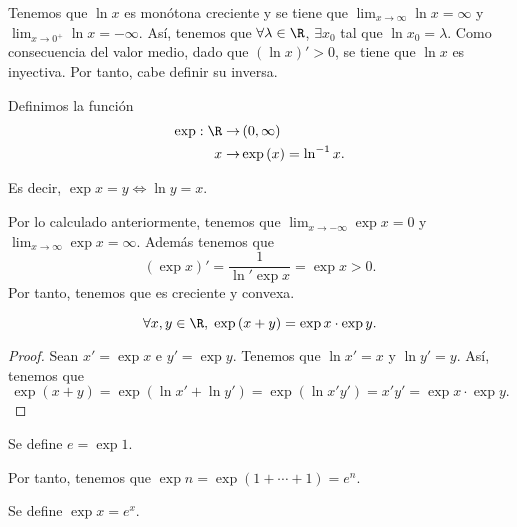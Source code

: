 \begin{observation}
\normalfont Tenemos que $\displaystyle \ln x $ es monótona creciente y se tiene que $\displaystyle \lim_{x \to \infty}\ln x = \infty $ y $\displaystyle \lim_{x \to 0^{+}} \ln x =- \infty$. Así, tenemos que $\displaystyle \forall \lambda \in \R $, $\displaystyle \exists x_{0} $ tal que $\displaystyle \ln x_{0} = \lambda$.
Como consecuencia del valor medio, dado que $\displaystyle \left(\ln x\right)' > 0 $, se tiene que $\displaystyle \ln x  $ es inyectiva. Por tanto, cabe definir su inversa.
\end{observation}
\begin{fdefinition}
\normalfont Definimos la función
\[
\begin{split}
	\exp : \R \to & \left(0, \infty\right) \\
	x \to & \exp\left(x\right) = \ln^{-1}x.
\end{split}
\]
\end{fdefinition}
\begin{observation}
\normalfont Es decir, $\displaystyle \exp x = y \iff \ln y = x $.
\end{observation}
Por lo calculado anteriormente, tenemos que $\displaystyle \lim_{x \to -\infty}\exp x = 0 $ y $\displaystyle \lim_{x \to \infty}\exp x = \infty $. Además tenemos que
\[ \left(\exp x\right) ' = \frac{1}{\ln' \exp x}= \exp x > 0 .\]
Por tanto, tenemos que es creciente y convexa. 
\begin{ftheorem}[]
\normalfont 
\[ \forall x,y \in \R, \; \exp\left(x+y\right) = \exp x \cdot \exp y .\]
\end{ftheorem}
\begin{proof}
Sean $\displaystyle x' = \exp x $ e $\displaystyle y' = \exp y $. Tenemos que $\displaystyle \ln x' = x $ y $\displaystyle \ln y' = y $. Así, tenemos que
\[ \exp\left(x+y\right) = \exp\left(\ln x' + \ln y'\right) = \exp\left(\ln x'y'\right) = x'y' = \exp x \cdot \exp y.\]
\end{proof}
\begin{notation}
\normalfont Se define $\displaystyle e = \exp 1 $.
\end{notation}
\begin{observation}
\normalfont Por tanto, tenemos que $\displaystyle \exp n = \exp\left(1 + \cdots + 1\right) = e^{n} $.
\end{observation}
\begin{notation}
\normalfont Se define $\displaystyle \exp x = e^{x} $.
\end{notation}
